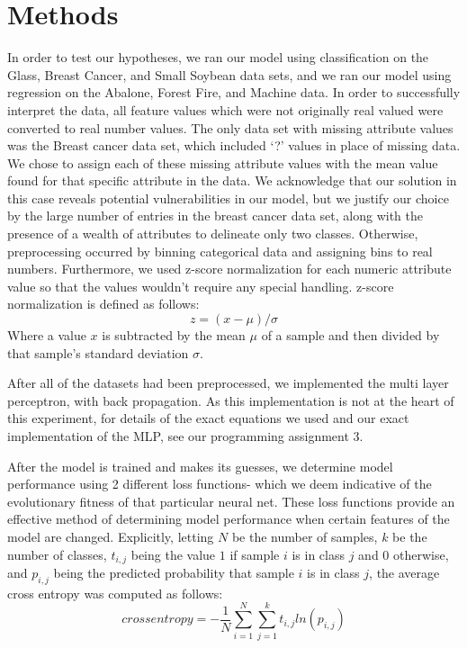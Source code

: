 \documentclass[twoside,11pt]{article}
\begin{document}
\section{Methods}
In order to test our hypotheses, we ran our model using classification on the Glass, Breast Cancer, and Small Soybean data sets, and 
we ran our model using regression on the Abalone, Forest Fire, and Machine data. In order to successfully interpret the data, all feature values
which were not originally real valued were converted to real number values. The only data set with missing attribute values was the Breast cancer
data set, which included `?' values in place of missing data. We chose to assign each of these missing attribute values with the mean value found for 
that specific attribute in the data. We acknowledge that our
solution in this case reveals potential vulnerabilities in our model, but we justify our choice by the large number of entries in the breast
cancer data set, along with the presence of a wealth of attributes to delineate only two classes. 
Otherwise, preprocessing occurred by binning categorical data and assigning bins to real numbers. Furthermore, we used z-score normalization 
for each numeric attribute value so that the values wouldn't require any special handling.
z-score normalization is defined as follows:
\begin{equation}
	z = (x-\mu)/\sigma
\end{equation}
Where a value $x$ is subtracted by the mean $\mu$ of a sample and then divided by that sample's standard deviation $\sigma$.

After all of the datasets had been preprocessed, we implemented the multi
layer perceptron, with back propagation. As this implementation is not at the heart of this experiment,
for details of the exact equations we used and our exact implementation of the MLP, see our programming assignment 3.

After the model is trained and makes its guesses, we determine model performance using 2 different loss functions- which we deem indicative of
the evolutionary fitness of that particular neural net.
These loss functions provide an effective method of determining model performance when certain features of the model are changed. Explicitly, letting
$N$ be the number of samples, $k$ be the number of classes, $t_{i,j}$ being the value $1$ if sample $i$ is in class $j$ and $0$ otherwise, and $p_{i,j}$ being the
predicted probability that sample $i$ is in class $j$, the average cross
entropy was computed as follows:
\begin{equation}
	cross entropy = -\frac{1}{N}\sum_{i=1}^{N}\sum_{j=1}^{k}t_{i,j}ln(p_{i,j})
\end{equation}
\end{document}
